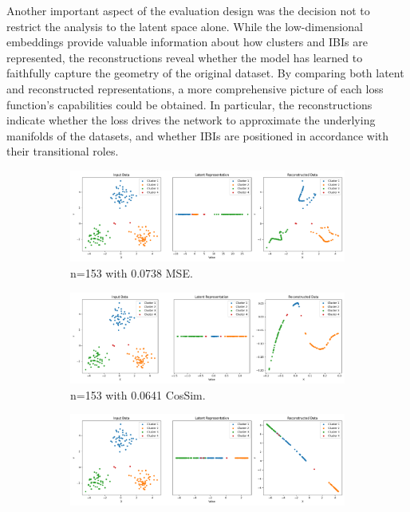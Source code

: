 Another important aspect of the evaluation design was the decision not to restrict the analysis to the latent space alone. While the low-dimensional embeddings provide valuable information about how clusters and IBIs are represented, the reconstructions reveal whether the model has learned to faithfully capture the geometry of the original dataset. By comparing both latent and reconstructed representations, a more comprehensive picture of each loss function’s capabilities could be obtained. In particular, the reconstructions indicate whether the loss drives the network to approximate the underlying manifolds of the datasets, and whether IBIs are positioned in accordance with their transitional roles.

\begin{figure}[htbp]
  \centering
  \begin{subfigure}[b]{1.0\textwidth}
    \centering
    \includegraphics[width=\linewidth]{images/RQ2/mse/2DBlobsS_-1_0.0738.png}
    \caption{n=153 with 0.0738 MSE.}
    \label{fig:RQ2/mse/2DBlobsS}
  \end{subfigure}
  \hfill
  \begin{subfigure}[b]{1.0\textwidth}
    \centering
    \includegraphics[width=\linewidth]{images/RQ2/csi/2DBlobsS_-1_0.0013.png}
    \caption{n=153 with 0.0641 CosSim.}
    \label{fig:RQ2/csi/2DBlobsS}
  \end{subfigure}
  \hfill
  \begin{subfigure}[b]{1.0\textwidth}
    \centering
    \includegraphics[width=\linewidth]{images/RQ2/kld/2DBlobsS_-1_0.0001.png}

\end{subfigure}
\end{figure}
